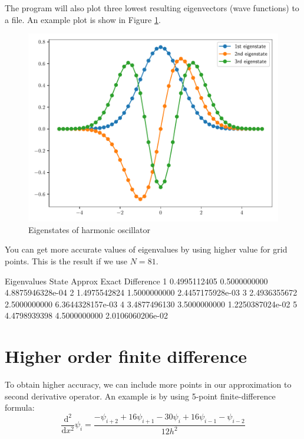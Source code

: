 The program will also plot three lowest resulting eigenvectors (wave functions) to a file.
An example plot is show in Figure \ref{fig:wfn_harm_01_51}.

\begin{figure}[h]
{\center
\includegraphics[width=\textwidth]{../codes/sch_1d/IMG_main_harmonic_01_51.pdf}
\par}
\caption{Eigenstates of harmonic oscillator}
\label{fig:wfn_harm_01_51}
\end{figure}

You can get more accurate values of eigenvalues by using higher value for grid points.
This is the result if we use $N=81$.
\begin{textcode}
Eigenvalues
State         Approx              Exact          Difference
   1       0.4995112405       0.5000000000   4.8875946328e-04
   2       1.4975542824       1.5000000000   2.4457175928e-03
   3       2.4936355672       2.5000000000   6.3644328157e-03
   4       3.4877496130       3.5000000000   1.2250387024e-02
   5       4.4798939398       4.5000000000   2.0106060206e-02 
\end{textcode}

\section{Higher order finite difference}

To obtain higher accuracy, we can include more points in our approximation to second
derivative operator. An example is by using 5-point finite-difference formula:
\begin{equation}
\frac{\mathrm{d}^2}{\mathrm{d}x^2} \psi_{i} =
\frac{-\psi_{i+2} + 16\psi_{i+1} - 30\psi_{i} + 16\psi_{i-1} - \psi_{i-2}}{12h^2}
\label{eq:fd_2nd_deriv_5pt}
\end{equation}


